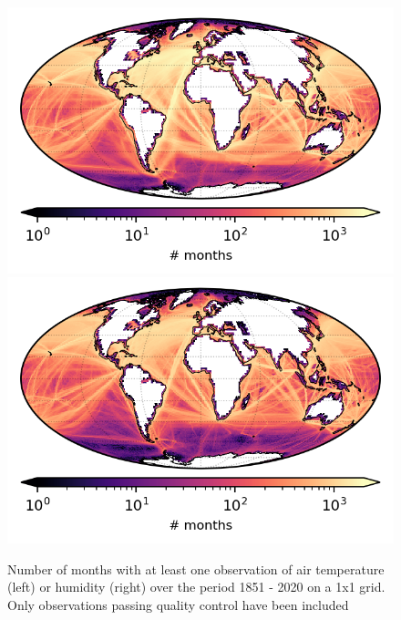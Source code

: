 \begin{figure}[h]
    \centering
    \includegraphics{resources/observations-at-months-map-optimal.png}
    \includegraphics{resources/observations-dpt-months-map-optimal.png}
    \caption{Number of months with at least one observation of air temperature (left) or humidity (right) over the period 1851 - 2020 on a 1x1 grid. Only observations passing quality control have been included}
    \label{fig:at-nmonths-map}
\end{figure}

\FloatBarrier
